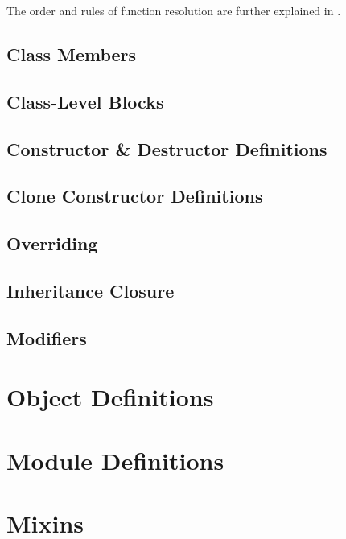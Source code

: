 The order and rules of function resolution are further explained in . 

\subsection{Class Members}
\label{sec:class-members}

\subsection{Class-Level Blocks}
\label{sec:class-level-blocks}

\subsection{Constructor \& Destructor Definitions}

\subsection{Clone Constructor Definitions}

\subsection{Overriding}
\label{sec:overriding}

\subsection{Inheritance Closure}

\subsection{Modifiers}
\label{sec:modifiers}

\section{Object Definitions}
\label{sec:object-definitions}

\section{Module Definitions}
\label{sec:module-definitions}

\section{Mixins}
\label{sec:mixins}

